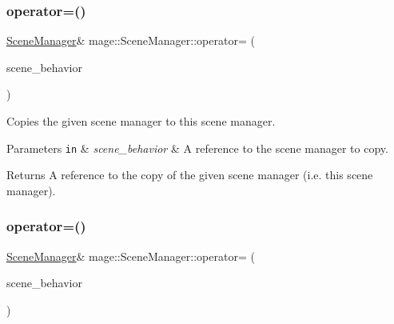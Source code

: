 \hypertarget{classmage_1_1_scene_manager_a90c17a35f737879fa07acb28f6d787af}{}\label{classmage_1_1_scene_manager_a90c17a35f737879fa07acb28f6d787af} 
\subsubsection{\texorpdfstring{operator=()}{operator=()}\hspace{0.1cm}{\footnotesize\ttfamily [1/2]}}
{\footnotesize\ttfamily \hyperlink{classmage_1_1_scene_manager}{Scene\+Manager}\& mage\+::\+Scene\+Manager\+::operator= (\begin{DoxyParamCaption}\item[{const \hyperlink{classmage_1_1_scene_manager}{Scene\+Manager} \&}]{scene\+\_\+behavior }\end{DoxyParamCaption})\hspace{0.3cm}{\ttfamily [delete]}}

Copies the given scene manager to this scene manager.


\begin{DoxyParams}[1]{Parameters}
\mbox{\tt in}  & {\em scene\+\_\+behavior} & A reference to the scene manager to copy. \\
\hline
\end{DoxyParams}
\begin{DoxyReturn}{Returns}
A reference to the copy of the given scene manager (i.\+e. this scene manager). 
\end{DoxyReturn}
\hypertarget{classmage_1_1_scene_manager_a5f2e494edeb329e54a928a1bc0f5f7df}{}\label{classmage_1_1_scene_manager_a5f2e494edeb329e54a928a1bc0f5f7df} 
\subsubsection{\texorpdfstring{operator=()}{operator=()}\hspace{0.1cm}{\footnotesize\ttfamily [2/2]}}
{\footnotesize\ttfamily \hyperlink{classmage_1_1_scene_manager}{Scene\+Manager}\& mage\+::\+Scene\+Manager\+::operator= (\begin{DoxyParamCaption}\item[{\hyperlink{classmage_1_1_scene_manager}{Scene\+Manager} \&\&}]{scene\+\_\+behavior }\end{DoxyParamCaption})\hspace{0.3cm}{\ttfamily [delete]}}

